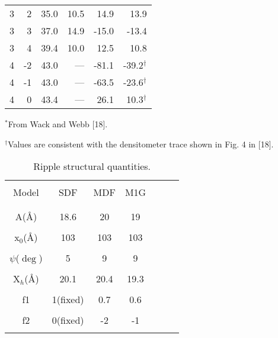 \begin{table}
\begin{center}
{\begin{tabular}{rrrrrr}
3 &   2 & 35.0  &  10.5  &  14.9  &  13.9 \\
3 &   3 & 37.0  &  14.9  &  -15.0  &  -13.4 \\
3 &   4 & 39.4  &  10.0  &  12.5  &  10.8 \\
4 &  -2 & 43.0  &  ---  &  -81.1  &  -39.2$^{\dag}$ \\
4 &  -1 & 43.0  &  ---  &  -63.5  &  -23.6$^{\dag}$ \\
4 &   0 & 43.4  &  ---  &  26.1  &  10.3$^{\dag}$ \\ \hline 
\end{tabular}
}
\end{center}
{\small
\indent $^{*}$From Wack and Webb [18].

\indent $^{\dag}$Values are consistent with the densitometer trace shown in 
	Fig. 4 in [18].
}
\end{table}

\pagebreak

\begin{table}
\begin{center}
\caption{Ripple structural quantities.
\label{parameter}}
\vspace{6pt}
{\tabcolsep=0.3in
\begin{tabular}{ccccccc} 
\\ \hline \\
Model & SDF & MDF & M1G \\ \\ \hline \\
A(\AA) & 18.6 & 20  & 19 \\ \\
x$_0$(\AA) & 103 & 103 & 103 \\ \\
$\psi$($\deg$) & 5 & 9 & 9 \\ \\
X$_h$(\AA) & 20.1 & 20.4 & 19.3 \\ \\
f1 & 1(fixed) & 0.7 & 0.6 \\ \\
f2 & 0(fixed) & -2 & -1 \\ \\ \hline
\end{tabular}
}
\end{center}
\end{table}



